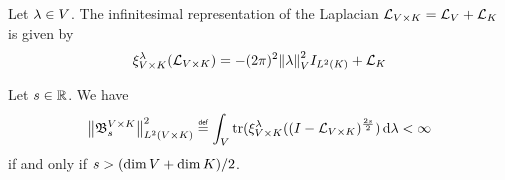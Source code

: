 \begin{lemma}
    Let $\lambda \in \VectorSpace$.
    The infinitesimal representation of the Laplacian $\Laplacian [\GroupDirect] = \Laplacian [\VectorSpace] + \Laplacian [\CompactGroup]$
    is given by
    \begin{align*}
        \Rep [\GroupDirect] \lambda (\Laplacian [\GroupDirect])
        = - (\turn)^2 \norm \lambda^2 \Id{\Lebesgue 2 \CompactGroup} + \Laplacian [\CompactGroup]
    \end{align*}
\end{lemma}

\begin{proposition}
    Let $s \in \R$.
    We have
    \begin{align*}
        \norm [\Lebesgue 2 \GroupDirect] {\BesselPotentialKernel [\GroupDirect] {s}}^2
        \defeq \int_\VectorSpace \tr(\Rep [\GroupDirect] \lambda (\BesselPotential [\GroupDirect] {2s}) \dd \lambda < \infty
    \end{align*}
    if and only if $s > (\dim \VectorSpace + \dim \CompactGroup) / 2$.
\end{proposition}

%
%
